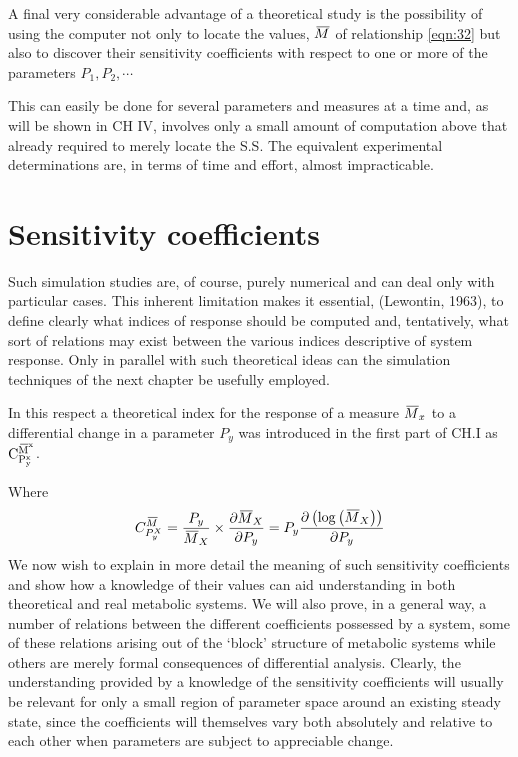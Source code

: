 A final very considerable advantage of a theoretical study is the possibility of using the computer not only to locate the values, $\,\overline{\!{M}}$ of relationship \eqref{eqn:32} but also to discover their sensitivity coefficients with respect to one or more of the parameters $P_{1}, P_{2}, \cdots$

This can easily be done for several parameters and measures at a time and, as will be shown in CH IV, involves only a small amount of computation above that already required to merely locate the S.S. The equivalent experimental determinations are, in terms of time and effort, almost impracticable.

\section{Sensitivity coefficients}

Such simulation studies are, of course, purely numerical and can deal only with particular cases. This inherent limitation makes it essential, (Lewontin, 1963), to define clearly what indices of response should be computed and, tentatively, what sort of relations may exist between the various indices descriptive of system response. Only in parallel with such theoretical ideas can the simulation techniques of the next chapter be usefully employed.

In this respect a theoretical index for the response of a measure $\,\overline{\!{M}}_{x}$ to a differential change in a parameter $P_{y}$ was introduced in the first part of CH.I as $\mathrm{C}_{\mathrm{P}_{\mathrm{y}}^{\mathrm{x}}}^{\,\overline{\!{\mathrm{M}}}^{\mathrm{x}}}$.

Where
%
\begin{equation}
C_{P_{y}^{X}}^{\,\overline{\!{M}}}=\frac{P_{y}}{\,\overline{\!{M}}_{X}} \times \frac{\partial \,\overline{\!{M}}_{X}}{\partial P_{y}}=P_{y} \dfrac{\partial\left(\log \left(\,\overline{\!{M}}_{X}\right)\right)}{\partial P_{y}}
\label{eqn:33}
\end{equation}
%
We now wish to explain in more detail the meaning of such sensitivity coefficients and show how a knowledge of their values can aid understanding in both theoretical and real metabolic systems. We will also prove, in a general way, a number of relations between the different coefficients possessed by a system, some of these relations arising out of the `block' structure of metabolic systems while others are merely formal consequences of differential analysis. Clearly, the understanding provided by a knowledge of the sensitivity coefficients will usually be relevant for only a small region of parameter space around an existing steady state, since the coefficients will themselves vary both absolutely and relative to each other when parameters are subject to appreciable change.

